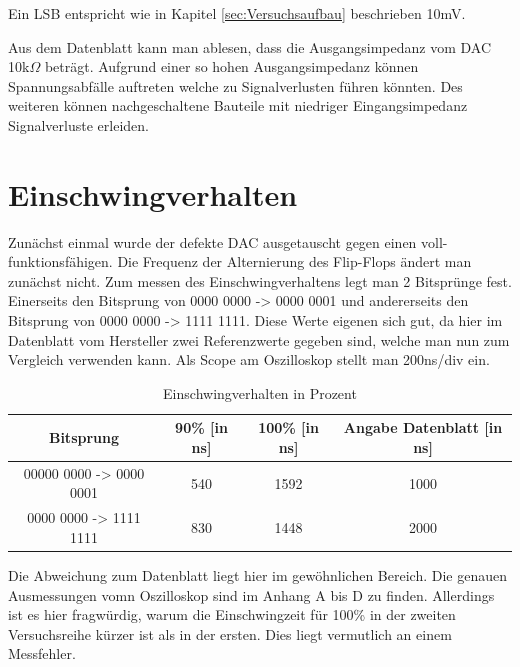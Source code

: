 Ein LSB entspricht wie in Kapitel \ref{sec:Versuchsaufbau} beschrieben 10mV.

Aus dem Datenblatt kann man ablesen, dass die Ausgangsimpedanz vom
DAC 10k$\Omega$ beträgt. Aufgrund einer so hohen Ausgangsimpedanz 
können Spannungsabfälle auftreten welche zu Signalverlusten führen 
könnten. Des weiteren können nachgeschaltene Bauteile mit niedriger
Eingangsimpedanz Signalverluste erleiden.




\section{Einschwingverhalten}

Zunächst einmal wurde der defekte DAC ausgetauscht 
gegen einen voll-funktionsfähigen. \newline
Die Frequenz der Alternierung des Flip-Flops ändert man zunächst nicht. \newline
Zum messen des Einschwingverhaltens legt man 2 Bitsprünge fest.
Einerseits den Bitsprung von 0000 0000 -> 0000 0001 und andererseits 
den Bitsprung von 0000 0000 -> 1111 1111.
Diese Werte eigenen sich gut, da hier im Datenblatt vom Hersteller 
zwei Referenzwerte gegeben sind, welche man nun zum Vergleich verwenden kann.\newline
Als Scope am Oszilloskop stellt man 200ns/div ein. \newline

\begin{table}[h]
	\centering
	\begin{tabular}[h]{c|c|c|c}
		Bitsprung & 90\% [in ns] & 100\% [in ns] & Angabe Datenblatt [in ns] \\
		\hline
		00000 0000 -> 0000 0001 & 540 & 1592 & 1000\\
		\hline
		0000 0000 -> 1111 1111 & 830 & 1448 & 2000\\
	\end{tabular}
	\caption{Einschwingverhalten in Prozent}
	\label{tab:Einschwingverhalten}
\end{table}

Die Abweichung zum Datenblatt liegt hier im gewöhnlichen Bereich.
Die genauen Ausmessungen vomn Oszilloskop sind im Anhang A bis D zu finden.
Allerdings ist es hier fragwürdig, warum die Einschwingzeit für 100\% in der
zweiten Versuchsreihe kürzer ist als in der ersten. Dies liegt vermutlich an
einem Messfehler. \newline 


